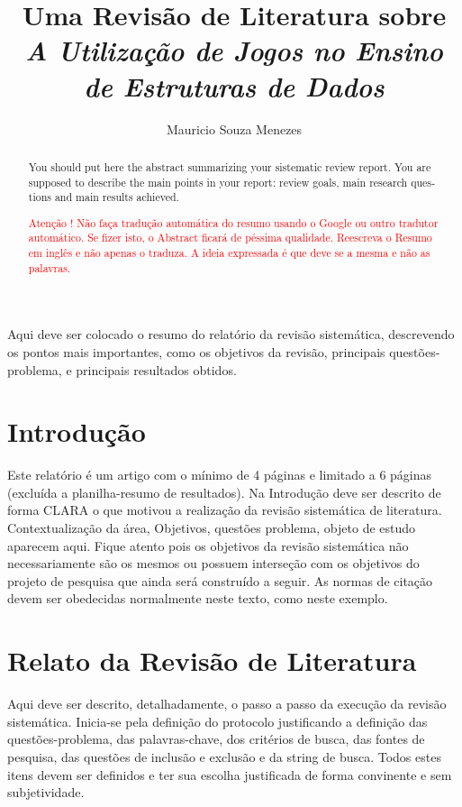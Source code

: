 \documentclass[12pt]{article}
\title{Uma Revisão de Literatura sobre \textit{A Utilização de Jogos no Ensino de Estruturas de Dados}}
\author{Mauricio Souza Menezes\\}
\begin{document}
 

\maketitle

\begin{resumo}
    Aqui deve ser colocado o resumo do relatório da revisão sistemática, descrevendo os pontos mais importantes, como os objetivos da revisão, principais questões-problema, e principais resultados obtidos.
\end{resumo}


\begin{abstract}
\begin{otherlanguage}{english}
    You should put here the abstract summarizing your sistematic review report. You are supposed to describe the main points in your report: review goals, main research questions and main results achieved. 
\end{otherlanguage} \textcolor{red}{Atenção ! Não faça tradução automática do resumo usando o Google ou outro tradutor automático. Se fizer isto, o Abstract ficará de péssima qualidade. Reescreva o Resumo em inglês e não apenas o traduza. A ideia expressada é que deve se a mesma e não as palavras.}
\end{abstract}


\section{Introdução}

Este relatório é um artigo com o mínimo de 4 páginas e limitado a 6 páginas (excluída a planilha-resumo de resultados). Na Introdução deve ser descrito de forma CLARA o que motivou a realização da revisão sistemática de literatura. Contextualização da área, Objetivos, questões problema, objeto de estudo aparecem aqui. Fique atento pois os objetivos da revisão sistemática não necessariamente são os mesmos ou possuem interseção com os objetivos do projeto de pesquisa que ainda será construído a seguir. As normas de citação devem ser obedecidas normalmente neste texto, como neste exemplo\cite{Laranjeira2015}.

\section{Relato da Revisão de Literatura}

Aqui deve ser descrito, detalhadamente, o passo a passo da execução da revisão sistemática. Inicia-se pela definição do protocolo justificando a definição das questões-problema, das palavras-chave, dos critérios de busca, das fontes de pesquisa, das questões de inclusão e exclusão e da string de busca. Todos estes itens devem ser definidos e ter sua escolha justificada de forma convinente e sem subjetividade.
\end{document}
